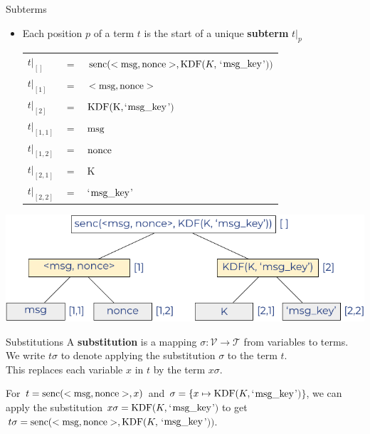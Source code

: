 \documentclass[11pt,aspectratio=169]{beamer}
\begin{document}
\begin{frame}[fragile]{Subterms}
    \begin{itemize}
        \item Each position $p$ of a term $t$ is the start of a unique
              \textbf{subterm} $t|_p$
        \begin{table}[]
            \footnotesize
            \raggedright
            \begin{tabular}{p{}p{}p{}}
                $t|_{[]}$    & $=$
                    & $\text{senc}(<\text{msg}, \text{nonce}>, \text{KDF}(K,$`$\text{msg}\_\text{key}$'$))$\\
                $t|_{[1]}$   & $=$ & $<\text{msg}, \text{nonce}>$\\
                $t|_{[2]}$   & $=$ & $\text{KDF}(\text{K}, $`$\text{msg}\_\text{key}$'$)$\\
                $t|_{[1,1]}$ & $=$ & $\text{msg}$\\
                $t|_{[1,2]}$ & $=$ & $\text{nonce}$\\
                $t|_{[2,1]}$ & $=$ & $\text{K}$\\
                $t|_{[2,2]}$ & $=$ & `$\text{msg}\_\text{key}$'
            \end{tabular}
        \end{table}
    \end{itemize}
    \vfill
    \begin{center}
        \includegraphics[width=.6\textwidth]{figures/lecture_1/terms_2}
    \end{center}
\end{frame}

\begin{frame}[fragile]{Substitutions}
    A \textbf{substitution} is a mapping $\sigma: \mathcal{V} \rightarrow 
    \mathcal{T}$ from variables to terms.\\[.3cm]

    We write $t\sigma$ to denote applying the substitution $\sigma$ to the term 
    $t$.\\[.3cm]

    This replaces each variable $x$ in $t$ by the term $x\sigma$.\\[.3cm]

    \begin{tcolorbox}[title=Example]
        For $t = \text{senc}(<\text{msg}, \text{nonce}>, x)$ and
        $\sigma = \{x \mapsto \text{KDF}(K,$`$\text{msg}\_\text{key}$'$)\}$,
        we can apply the substitution
        $x\sigma = \text{KDF}(K,$`$\text{msg}\_\text{key}$'$)$
        to get
        $t\sigma = \text{senc}(<\text{msg}, \text{nonce}>, \text{KDF}(K, $`$\text{msg}\_\text{key}$'$))$.
    \end{tcolorbox}
\end{frame}
\end{document}
